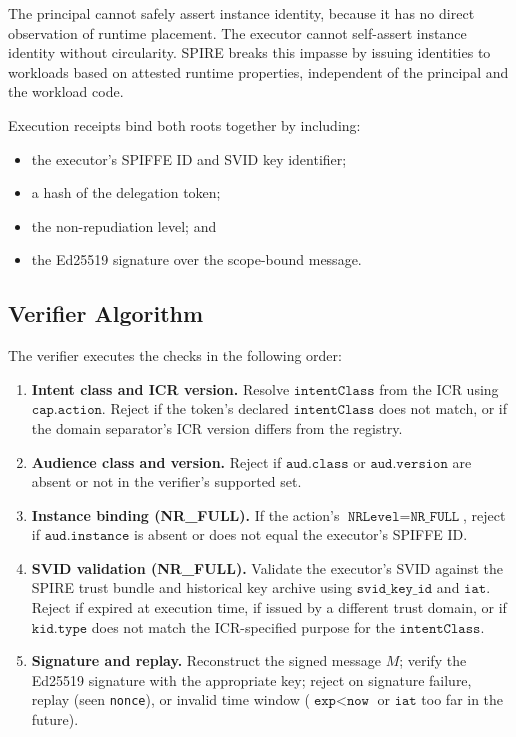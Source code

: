 \documentclass[11pt]{article}
\begin{document}
The principal cannot safely assert instance identity, because it has
no direct observation of runtime placement. The executor cannot
self-assert instance identity without circularity. SPIRE breaks this
impasse by issuing identities to workloads based on attested runtime
properties, independent of the principal and the workload code.

Execution receipts bind both roots together by including:

\begin{itemize}
  \item the executor's SPIFFE ID and SVID key identifier;
  \item a hash of the delegation token;
  \item the non-repudiation level; and
  \item the Ed25519 signature over the scope-bound message.
\end{itemize}

\subsection{Verifier Algorithm}

The verifier executes the checks in the following order:

\begin{enumerate}[label=Step~\arabic*:]
  \item \textbf{Intent class and ICR version.} Resolve
        \(\texttt{intentClass}\) from the ICR using \(\texttt{cap.action}\).
        Reject if the token's declared \(\texttt{intentClass}\) does
        not match, or if the domain separator's ICR version differs
        from the registry.

  \item \textbf{Audience class and version.} Reject if
        \(\texttt{aud.class}\) or \(\texttt{aud.version}\) are absent
        or not in the verifier's supported set.

  \item \textbf{Instance binding (NR\_FULL).} If the action's
        \(\texttt{NRLevel} = \texttt{NR\_FULL}\), reject if
        \(\texttt{aud.instance}\) is absent or does not equal the
        executor's SPIFFE ID.

  \item \textbf{SVID validation (NR\_FULL).} Validate the executor's
        SVID against the SPIRE trust bundle and historical key archive
        using \(\texttt{svid\_key\_id}\) and \(\texttt{iat}\).
        Reject if expired at execution time, if issued by a different
        trust domain, or if \(\texttt{kid.type}\) does not match
        the ICR-specified purpose for the \(\texttt{intentClass}\).

  \item \textbf{Signature and replay.} Reconstruct the signed message
        \(M\); verify the Ed25519 signature with the appropriate key;
        reject on signature failure, replay (seen \texttt{nonce}), or
        invalid time window (\(\texttt{exp} < \texttt{now}\) or
        \(\texttt{iat}\) too far in the future).
\end{enumerate}
\end{document}
